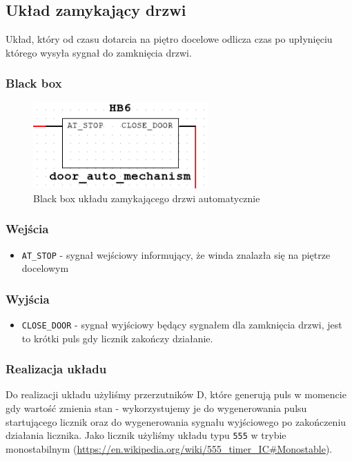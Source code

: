 \documentclass[a4paper]{article}
\begin{document}
\subsection{Układ zamykający drzwi}
Układ, który od czasu dotarcia na piętro docelowe odlicza czas po upłynięciu którego wysyła 
sygnał do zamknięcia drzwi. 

\subsubsection{Black box}
\begin{figure}
    \centering
    \includegraphics[width=0.6\textwidth]{door_auto_mechanism.png}
    \caption{Black box układu zamykającego drzwi automatycznie}
\end{figure}

\subsubsection{Wejścia}
\begin{itemize}
    \item \verb|AT_STOP| - sygnał wejściowy informujący, że winda znalazła się na piętrze docelowym
\end{itemize}
\subsubsection{Wyjścia}
\begin{itemize}
    \item \verb|CLOSE_DOOR| - sygnał wyjściowy będący sygnałem dla zamknięcia drzwi, jest to krótki puls 
        gdy licznik zakończy działanie.
\end{itemize}
\subsubsection{Realizacja układu}
Do realizacji układu użyliśmy przerzutników D, które generują puls w momencie gdy wartość zmienia stan - wykorzystujemy
je do wygenerowania pulsu startującego licznik oraz do wygenerowania sygnału wyjściowego po zakończeniu działania licznika.
Jako licznik użyliśmy układu typu \verb|555| w trybie monostabilnym (\url{https://en.wikipedia.org/wiki/555_timer_IC#Monostable}).
\end{document}
